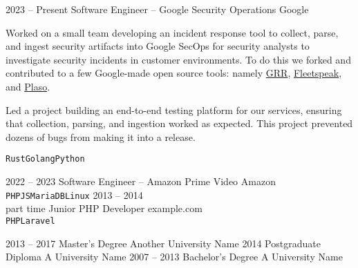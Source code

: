 \documentclass[9pt]{developercv} %
\begin{document}
\begin{entrylist}
  \entry
  {2023 -- Present}
  {Software Engineer -- Google Security Operations}
  {Google}
  {Worked on a small team developing an incident response tool to collect,
    parse, and ingest security artifacts into Google SecOps for security
    analysts to investigate security incidents in customer environments. To do
    this we forked and contributed to a few Google-made open source tools:
    namely \href{https://github.com/google/grr}{GRR},
    \href{https://github.com/google/fleetspeak}{Fleetspeak}, and
    \href{https://github.com/log2timeline/plaso}{Plaso}.

		Led a project building an end-to-end testing platform for our services,
		ensuring that collection, parsing, and ingestion worked as expected. This
		project prevented dozens of bugs from making it into a release.

  \texttt{Rust}\slashsep\texttt{Golang}\slashsep\texttt{Python}}
  \entry
  {2022 -- 2023}
  {Software Engineer -- Amazon Prime Video}
  {Amazon}
  {\lorem\lorem\\ \texttt{PHP}\slashsep\texttt{JS}\slashsep\texttt{MariaDB}\slashsep\texttt{Linux}}
  \entry
  {2013 -- 2014\\\footnotesize{part time}}
  {Junior PHP Developer}
  {example.com}
  {\lorem\lorem\\ \texttt{PHP}\slashsep\texttt{Laravel}}
\end{entrylist}



\begin{entrylist}
  \entry
  {2013 -- 2017}
  {Master's Degree}
  {Another University Name}
  {\lorem\lorem\lorem}
  \entry
  {2014}
  {Postgraduate Diploma}
  {A University Name}
  {\lorem\lorem}
  \entry
  {2007 -- 2013}
  {Bachelor's Degree}
  {A University Name}
  {\lorem\lorem}
\end{entrylist}

\end{document}
